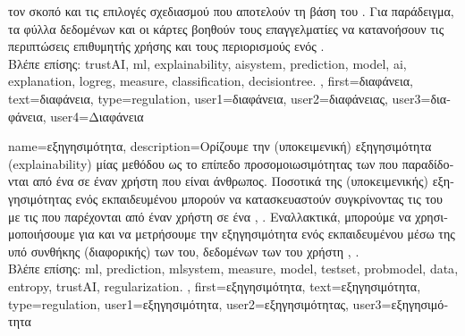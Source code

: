 {{{		τον σκοπό και τις επιλογές σχεδιασμού που αποτελούν τη βάση του} . 
		\foreignlanguage{greek}{Για παράδειγμα, τα φύλλα δεδομένων}  
		\cite{DatasheetData2021} \foreignlanguage{greek}{και οι κάρτες}   
		\cite{10.1145/3287560.3287596} \foreignlanguage{greek}{βοηθούν τους επαγγελματίες να κατανοήσουν 
		τις περιπτώσεις επιθυμητής χρήσης και τους περιορισμούς ενός}  \cite{Shahriari2017}. 
		\\
		\foreignlanguage{greek}{Βλέπε επίσης:} \gls{trustAI}, \gls{ml}, \gls{explainability}, \gls{aisystem}, \gls{prediction}, 
		\gls{model}, \gls{ai}, \gls{explanation}, \gls{logreg}, \gls{measure}, \gls{classification}, \gls{decisiontree}. },
	first={\foreignlanguage{greek}{διαφάνεια}}, 
	text={\foreignlanguage{greek}{διαφάνεια}},
	type=regulation,
	user1={\foreignlanguage{greek}{διαφάνεια}}, %
    	user2={\foreignlanguage{greek}{διαφάνειας}}, %
	user3={\foreignlanguage{greek}{διαφάνεια}}, %
	user4={\foreignlanguage{greek}{Διαφάνεια}} %
}

{name={\foreignlanguage{greek}{εξηγησιμότητα}},
	description={\foreignlanguage{greek}{Ορίζουμε την (υποκειμενική) εξηγησιμότητα} 
		(explainability) \foreignlanguage{greek}{μίας μεθόδου}  \foreignlanguage{greek}{ως το επίπεδο προσομοιωσιμότητας} 
		\cite{Colin:2022aa} \foreignlanguage{greek}{των}  \foreignlanguage{greek}{που παραδίδονται από ένα} 
		 \foreignlanguage{greek}{σε έναν χρήστη που είναι άνθρωπος. Ποσοτικά}  
		\foreignlanguage{greek}{της (υποκειμενικής) εξηγησιμότητας ενός εκπαιδευμένου}  
		\foreignlanguage{greek}{μπορούν να κατασκευαστούν συγκρίνοντας τις}  \foreignlanguage{greek}{του με 
		τις}  \foreignlanguage{greek}{που παρέχονται από έναν χρήστη σε ένα}  
		\cite{Zhang:2024aa}, \cite{Colin:2022aa}. \foreignlanguage{greek}{Εναλλακτικά, μπορούμε να χρησιμοποιήσουμε} 
		 \foreignlanguage{greek}{για}  \foreignlanguage{greek}{και να μετρήσουμε την 
		εξηγησιμότητα ενός εκπαιδευμένου}   \foreignlanguage{greek}{μέσω της υπό συνθήκης 
		(διαφορικής)}  \foreignlanguage{greek}{των}  \foreignlanguage{greek}{του}, 
		\foreignlanguage{greek}{δεδομένων των}  \foreignlanguage{greek}{του χρήστη} 
		\cite{JunXML2020}, \cite{Chen2018}. 
		\\
		\foreignlanguage{greek}{Βλέπε επίσης:} \gls{ml}, \gls{prediction}, \gls{mlsystem}, \gls{measure}, \gls{model}, \gls{testset}, \gls{probmodel}, 
		\gls{data}, \gls{entropy}, \gls{trustAI}, \gls{regularization}. },
	first={\foreignlanguage{greek}{εξηγησιμότητα}},
	text={\foreignlanguage{greek}{εξηγησιμότητα}},
	type=regulation,
	user1={\foreignlanguage{greek}{εξηγησιμότητα}}, %
	user2={\foreignlanguage{greek}{εξηγησιμότητας}}, %
	user3={\foreignlanguage{greek}{εξηγησιμότητα}} %
}

